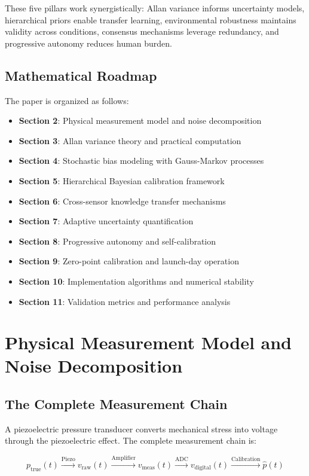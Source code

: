 \documentclass[11pt]{article}
\begin{document}
These five pillars work synergistically: Allan variance informs uncertainty models, hierarchical priors enable transfer learning, environmental robustness maintains validity across conditions, consensus mechanisms leverage redundancy, and progressive autonomy reduces human burden.

\subsection{Mathematical Roadmap}

The paper is organized as follows:

\begin{itemize}
\item \textbf{Section 2}: Physical measurement model and noise decomposition
\item \textbf{Section 3}: Allan variance theory and practical computation
\item \textbf{Section 4}: Stochastic bias modeling with Gauss-Markov processes
\item \textbf{Section 5}: Hierarchical Bayesian calibration framework
\item \textbf{Section 6}: Cross-sensor knowledge transfer mechanisms
\item \textbf{Section 7}: Adaptive uncertainty quantification
\item \textbf{Section 8}: Progressive autonomy and self-calibration
\item \textbf{Section 9}: Zero-point calibration and launch-day operation
\item \textbf{Section 10}: Implementation algorithms and numerical stability
\item \textbf{Section 11}: Validation metrics and performance analysis
\end{itemize}

\section{Physical Measurement Model and Noise Decomposition}

\subsection{The Complete Measurement Chain}

A piezoelectric pressure transducer converts mechanical stress into voltage through the piezoelectric effect. The complete measurement chain is:

\begin{equation}
p_{\text{true}}(t) \xrightarrow{\text{Piezo}} v_{\text{raw}}(t) \xrightarrow{\text{Amplifier}} v_{\text{meas}}(t) \xrightarrow{\text{ADC}} v_{\text{digital}}(t) \xrightarrow{\text{Calibration}} \hat{p}(t)
\end{equation}
\end{document}
